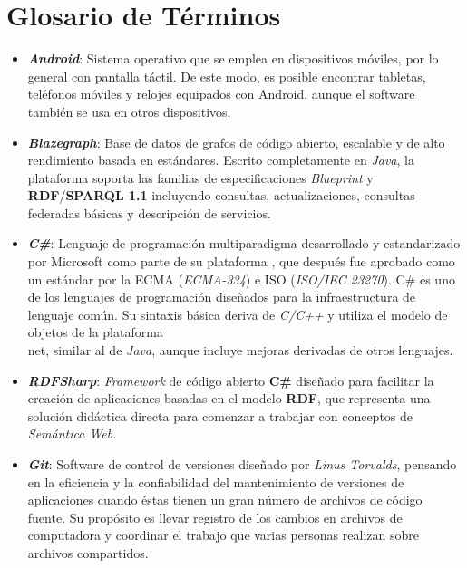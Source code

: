 \section{Glosario de Términos}
\begin{itemize}


    \item \textbf{\textit{Android}}: Sistema operativo que se emplea 
    en dispositivos móviles, por lo general con pantalla táctil. 
    De este modo, es posible encontrar tabletas, teléfonos móviles 
    y relojes equipados con Android, aunque el software también 
    se usa en otros dispositivos. 

    \item \textbf{\textit{Blazegraph}}: Base de datos de grafos de 
    código abierto, escalable y de alto rendimiento basada en 
    estándares. Escrito completamente en \emph{Java}, la plataforma soporta 
    las familias de especificaciones \emph{Blueprint} y \textbf{RDF}/\textbf{SPARQL 1.1}
    incluyendo consultas, actualizaciones, consultas federadas básicas
    y descripción de servicios. 
    
    \item \textbf{\textit{C\#}}: Lenguaje de programación multiparadigma 
    desarrollado y estandarizado por Microsoft como parte de su 
    plataforma \textbf{\net}, que después fue aprobado como un estándar por la
    ECMA (\emph{ECMA-334}) e ISO (\emph{ISO/IEC 23270}). 
    C\# es uno de los lenguajes de programación diseñados para la 
    infraestructura de lenguaje común. Su sintaxis básica deriva de 
    \emph{C/C++} y utiliza el modelo de objetos de la plataforma \\net, 
    similar al de \emph{Java}, aunque incluye mejoras derivadas de otros lenguajes.


    \item \textbf{\textit{RDFSharp}}: \emph{Framework} de código 
    abierto \textbf{C\#} diseñado para facilitar la creación de 
    aplicaciones \emph{\net} basadas en el modelo \textbf{RDF}, 
    que representa una solución didáctica directa para comenzar 
    a trabajar con conceptos de \emph{Semántica Web}.

    \item \textbf{\textit{Git}}: Software de control de versiones 
    diseñado por \emph{Linus Torvalds}, pensando en la eficiencia 
    y la confiabilidad del mantenimiento de versiones de aplicaciones 
    cuando éstas tienen un gran número de archivos de código fuente. 
    Su propósito es llevar registro de los cambios en archivos de 
    computadora y coordinar el trabajo que varias personas realizan 
    sobre archivos compartidos.


\end{itemize}
